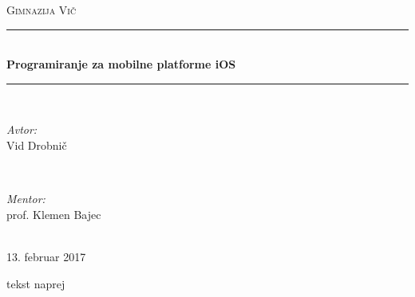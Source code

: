 \documentclass[a4paper, 12pt]{article}
\begin{document}
	\begin{titlepage}
		\newcommand{\HRule}{\rule{\linewidth}{0.5mm}}
		\center
		
		\textsc{\LARGE Gimnazija Vič}\\[2cm]

		\HRule \\[0.4cm]
		{ \huge \bfseries Programiranje za mobilne platforme iOS}\\[0.4cm]
		\HRule \\[1.5cm]
		
		\begin{minipage}{0.4\textwidth}
			\begin{flushleft} \large
				\emph{Avtor:}\\
				Vid Drobnič
			\end{flushleft}
		\end{minipage}
		~
		\begin{minipage}{0.4\textwidth}
			\begin{flushright} \large
				\emph{Mentor:} \\
				prof. Klemen Bajec
			\end{flushright}
		\end{minipage}\\[4cm]
		
		{\large 13. februar 2017}\\[3cm]
		\vfill
	\end{titlepage}
	
	tekst naprej
\end{document}

